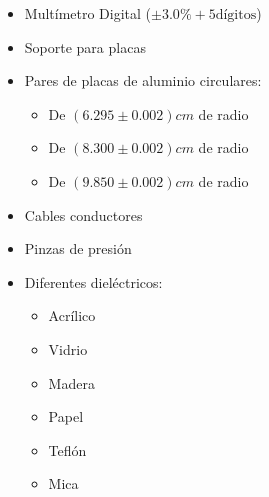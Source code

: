 \documentclass[letterpaper, 11 pt]{article}
\begin{document}
\begin{multicols}{2}
\begin{itemize}
     \item Multímetro Digital ($\pm3.0\%  + 5  \text{dígitos}$)
    \item Soporte para placas
    \item Pares de placas de aluminio circulares:
    \begin{itemize}
        \item De $(6.295 \pm 0.002) cm$ de radio
        \item De $(8.300 \pm 0.002) cm$ de radio
        \item De $(9.850 \pm 0.002) cm$ de radio
        \end{itemize}{}
    \item Cables conductores 
    \item Pinzas de presión
      \item Diferentes dieléctricos:
     \begin{itemize}
         \item Acrílico
         \item Vidrio
         \item Madera
         \item Papel
         \item Teflón
         \item Mica
     \end{itemize}{}
\end{itemize}{}



\end{multicols}
\end{document}
